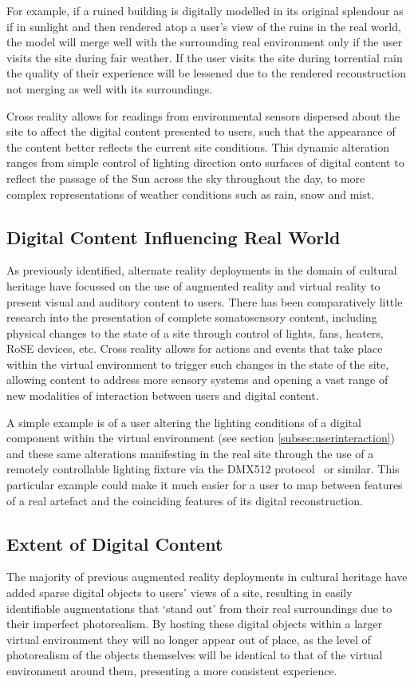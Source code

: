 \documentclass{sig-alternate}
\begin{document}
{For example, if a ruined building is digitally modelled in its original splendour as if in sunlight and then rendered atop a user's view of the ruins in the real world, the model will merge well with the surrounding real environment only if the user visits the site during fair weather. If the user visits the site during torrential rain the quality of their experience will be lessened due to the rendered reconstruction not merging as well with its surroundings.

Cross reality allows for readings from environmental sensors dispersed about the site to affect the digital content presented to users, such that the appearance of the content better reflects the current site conditions. This dynamic alteration ranges from simple control of lighting direction onto surfaces of digital content to reflect the passage of the Sun across the sky throughout the day, to more complex representations of weather conditions such as rain, snow and mist.

\subsection{Digital Content Influencing Real World}
As previously identified, alternate reality deployments in the domain of cultural heritage have focussed on the use of augmented reality and virtual reality to present visual and auditory content to users. There has been comparatively little research into the presentation of complete somatosensory content, including physical changes to the state of a site through control of lights, fans, heaters, RoSE devices, etc. Cross reality allows for actions and events that take place within the virtual environment to trigger such changes in the state of the site, allowing content to address more sensory systems and opening a vast range of new modalities of interaction between users and digital content.

A simple example is of a user altering the lighting conditions of a digital component within the virtual environment (see section \ref{subsec:userinteraction}) and these same alterations manifesting in the real site through the use of a remotely controllable lighting fixture via the DMX512 protocol~\cite{Technology} or similar. This particular example could make it much easier for a user to map between features of a real artefact and the coinciding features of its digital reconstruction.

\subsection{Extent of Digital Content}
\label{subsec:extentdigital}
The majority of previous augmented reality deployments in cultural heritage have added sparse digital objects to users' views of a site, resulting in easily identifiable augmentations that `stand out' from their real surroundings due to their imperfect photorealism. By hosting these digital objects within a larger virtual environment they will no longer appear out of place, as the level of photorealism of the objects themselves will be identical to that of the virtual environment around them, presenting a more consistent experience.

}
\end{document}
